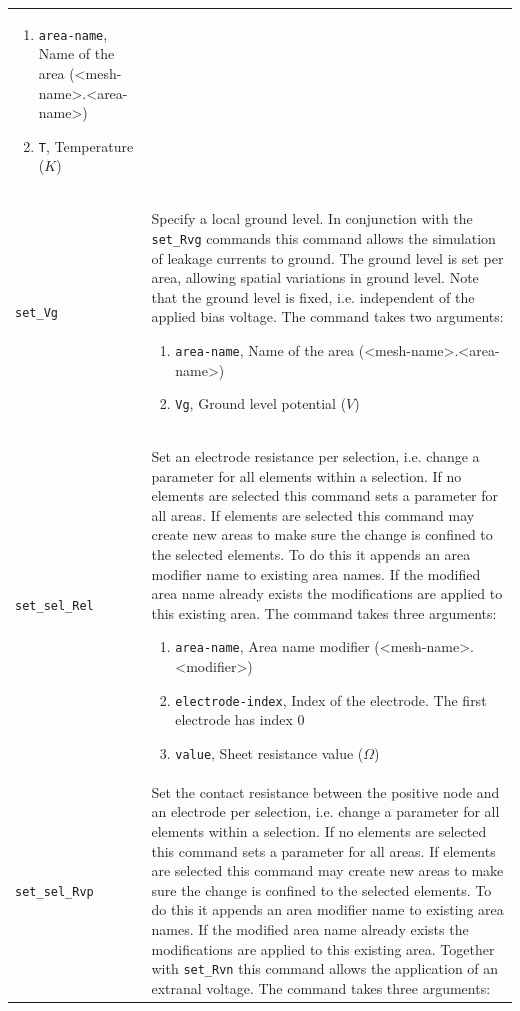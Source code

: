 \documentclass[noshowpacs,preprintnumbers,amsmath,amssymb, letter]{revtex4}
\begin{document}
\begin{longtable}{p{}p{}}
\begin{enumerate}
\item \texttt{area-name}, Name of the area (\textless mesh-name\textgreater .\textless area-name\textgreater )
\item \texttt{T}, Temperature ($K$)
\end{enumerate}\\
\texttt{set\_Vg}	&  Specify a local ground level. In conjunction with the \texttt{set\_Rvg} commands this command allows the simulation of leakage currents to ground. The ground level is set per area, allowing spatial variations in ground level. Note that the ground level is fixed, i.e. independent of the applied bias voltage. The command takes two arguments:
\begin{enumerate}
\item \texttt{area-name}, Name of the area (\textless mesh-name\textgreater .\textless area-name\textgreater )
\item \texttt{Vg}, Ground level potential ($V$)
\end{enumerate}\\
\texttt{set\_sel\_Rel}	&  Set an electrode resistance per selection, i.e. change a parameter for all elements within a selection. If no elements are selected this command sets a parameter for all areas. If elements are selected this command may create new areas to make sure the change is confined to the selected elements. To do this it appends an area modifier name to existing area names. If the modified area name already exists the modifications are applied to this existing area. The command takes three arguments:
\begin{enumerate}
\item \texttt{area-name}, Area name modifier (\textless mesh-name\textgreater .\textless modifier\textgreater )
\item \texttt{electrode-index}, Index of the electrode. The first electrode has index 0
\item \texttt{value}, Sheet resistance value ($\Omega$)
\end{enumerate}\\
\texttt{set\_sel\_Rvp}	&  Set the contact resistance between the positive node and an electrode per selection, i.e. change a parameter for all elements within a selection. If no elements are selected this command sets a parameter for all areas. If elements are selected this command may create new areas to make sure the change is confined to the selected elements. To do this it appends an area modifier name to existing area names. If the modified area name already exists the modifications are applied to this existing area. Together with \texttt{set\_Rvn} this command allows the application of an extranal voltage. The command takes three arguments:

\end{longtable}
\end{document}
